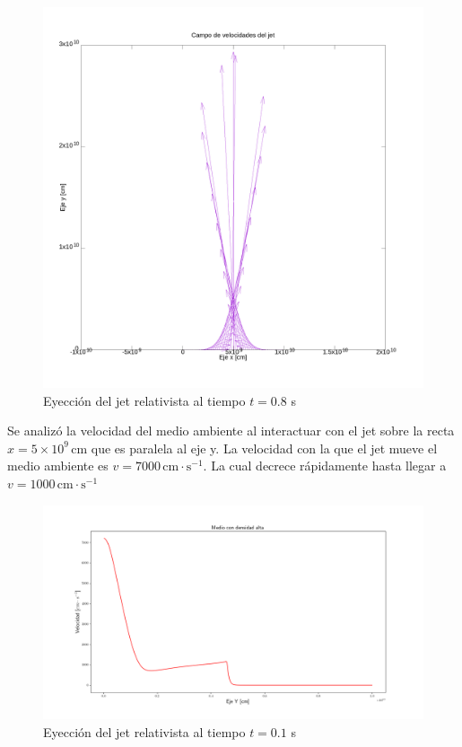 \documentclass[12pt,a4paper]{book}
\begin{document}
\begin{figure}
\centering
\includegraphics[scale=0.15]{./Figuras/densidad_de_medios_ambientes/medio_alto/vel_vector_t80_ma_1e4}
\caption{\label{fig:jet_vel_alto}Eyección del jet relativista al tiempo $t = 0.8$ s}
\end{figure}

Se analizó la velocidad del medio ambiente al interactuar con el jet sobre la recta $x = 5 \times 10^9 \, \mathrm{cm}$ que es paralela al eje y. La velocidad con la que el jet mueve el medio ambiente es $v = 7000 \, \mathrm{cm} \cdot \mathrm{s}^{-1}$. La cual decrece rápidamente hasta llegar a $v = 1000 \, \mathrm{cm} \cdot \mathrm{s}^{-1}$

\begin{figure}
\centering
\includegraphics[scale=0.4]{./Figuras/densidad_de_medios_ambientes/medio_alto/vel_alta}
\caption{\label{fig:velocidades_alta}Eyección del jet relativista al tiempo $t = 0.1$ s}
\end{figure}
\end{document}
